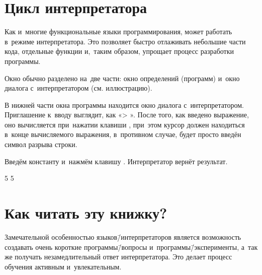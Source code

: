 \section{Цикл интерпретатора}%
Как и~многие функциональные языки программирования, \Scheme может работать в~режиме интерпретатора. Это позволяет быстро отлаживать небольшие части кода, отдельные функции и,~таким образом, упрощает процесс разработки \mbox{программы}.

Окно  обычно разделено на~две части: окно определений (программ) и~окно диалога с~интерпретатором (см. иллюстрацию).
\vspace{-\medskipamount}
\begin{center}
\end{center}

В нижней части окна программы  находится окно диалога с~интерпретатором. Приглашение к~вводу выглядит, как «> ». После того, как введено выражение, оно вычисляется при~нажатии клавиши , при~этом курсор должен находиться в~конце вычисляемого выражения, в~противном случае, будет просто введён символ разрыва строки.

\begin{example}{%
Введём константу и~нажмём клавишу . Интерпретатор вернёт результат.}

\REPL
  {5}
  {5}

\end{example}

\section{Как читать эту книжку?}%
Замечательной особенностью языков\=/интерпретаторов является возможность создавать очень короткие программы\=/вопросы и~программы\=/эксперименты, а~так же получать незамедлительный ответ интерпретатора. Это делает процесс обучения активным и~увлекательным.

